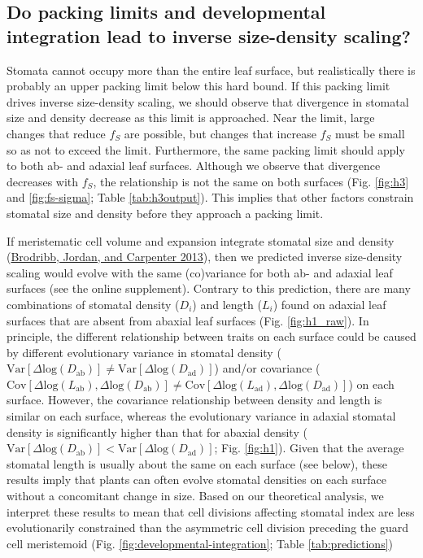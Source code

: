 \documentclass[
  12pt,
]{article}
\begin{document}
\hypertarget{do-packing-limits-and-developmental-integration-lead-to-inverse-size-density-scaling}{%
\subsection{Do packing limits and developmental integration lead to inverse size-density scaling?}\label{do-packing-limits-and-developmental-integration-lead-to-inverse-size-density-scaling}}

Stomata cannot occupy more than the entire leaf surface, but realistically there is probably an upper packing limit below this hard bound. If this packing limit drives inverse size-density scaling, we should observe that divergence in stomatal size and density decrease as this limit is approached. Near the limit, large changes that reduce \(f_S\) are possible, but changes that increase \(f_S\) must be small so as not to exceed the limit. Furthermore, the same packing limit should apply to both ab- and adaxial leaf surfaces. Although we observe that divergence decreases with \(f_S\), the relationship is not the same on both surfaces (Fig. \ref{fig:h3} and \ref{fig:fs-sigma}; Table \ref{tab:h3output}). This implies that other factors constrain stomatal size and density before they approach a packing limit.

If meristematic cell volume and expansion integrate stomatal size and density (\protect\hyperlink{ref-brodribb_unified_2013}{Brodribb, Jordan, and Carpenter 2013}), then we predicted inverse size-density scaling would evolve with the same (co)variance for both ab- and adaxial leaf surfaces (see the online supplement). Contrary to this prediction, there are many combinations of stomatal density (\(D_i\)) and length (\(L_i\)) found on adaxial leaf surfaces that are absent from abaxial leaf surfaces (Fig. \ref{fig:h1_raw}). In principle, the different relationship between traits on each surface could be caused by different evolutionary variance in stomatal density (\(\text{Var}[\Delta \text{log}(D_\text{ab})] \ne \text{Var}[\Delta \text{log}(D_\text{ad})]\)) and/or covariance (\(\text{Cov}[\Delta \text{log}(L_\text{ab}), \Delta \text{log}(D_\text{ab})] \ne \text{Cov}[\Delta \text{log}(L_\text{ad}), \Delta \text{log}(D_\text{ad})]\)) on each surface. However, the covariance relationship between density and length is similar on each surface, whereas the evolutionary variance in adaxial stomatal density is significantly higher than that for abaxial density (\(\text{Var}[\Delta \text{log}(D_\text{ab})] < \text{Var}[\Delta \text{log}(D_\text{ad})]\); Fig. \ref{fig:h1}). Given that the average stomatal length is usually about the same on each surface (see below), these results imply that plants can often evolve stomatal densities on each surface without a concomitant change in size. Based on our theoretical analysis, we interpret these results to mean that cell divisions affecting stomatal index are less evolutionarily constrained than the asymmetric cell division preceding the guard cell meristemoid (Fig. \ref{fig:developmental-integration}; Table \ref{tab:predictions})
\end{document}
